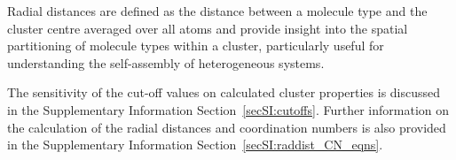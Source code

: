 Radial distances are defined as the distance between a molecule type and the cluster centre averaged over all atoms and provide insight into the spatial partitioning of molecule types within a cluster, particularly useful for understanding the self-assembly of heterogeneous systems.

The sensitivity of the cut-off values on calculated cluster properties is discussed in the Supplementary Information Section~\ref{secSI:cutoffs}. Further information on the calculation of the radial distances and coordination numbers is also provided in the Supplementary Information Section~\ref{secSI:raddist_CN_eqns}.



